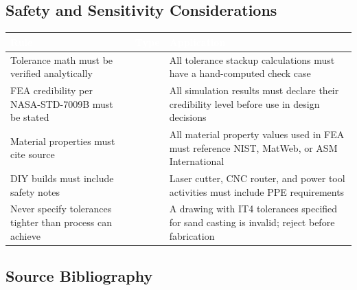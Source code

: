 \documentclass[11pt,letterpaper]{article}
\newcommand{\tableheader}[1]{\textbf{\sffamily\textcolor{white}{#1}}}
\newcommand{\blocktag}{\textcolor{blockred}{\textbf{\sffamily[BLOCK]}}}
\newcommand{\gatetag}{\textcolor{gateyellow}{\textbf{\sffamily[GATE]}}}
\newcommand{\annotag}{\textcolor{annogreen}{\textbf{\sffamily[ANNOTATE]}}}
\begin{document}
\subsection{Safety and Sensitivity Considerations}

\begin{center}
\begin{tabularx}{\textwidth}{L{3cm}L{2cm}X}
\toprule
{}
\tableheader{Rule} & \tableheader{Type} & \tableheader{Application} \\
\midrule
Tolerance math must be verified analytically & \blocktag & All tolerance stackup calculations must have a hand-computed check case \\
FEA credibility per NASA-STD-7009B must be stated & \gatetag & All simulation results must declare their credibility level before use in design decisions \\
Material properties must cite source & \gatetag & All material property values used in FEA must reference NIST, MatWeb, or ASM International \\
DIY builds must include safety notes & \annotag & Laser cutter, CNC router, and power tool activities must include PPE requirements \\
Never specify tolerances tighter than process can achieve & \blocktag & A drawing with IT4 tolerances specified for sand casting is invalid; reject before fabrication \\
\bottomrule
\end{tabularx}
\end{center}

\subsection{Source Bibliography}
\end{document}
